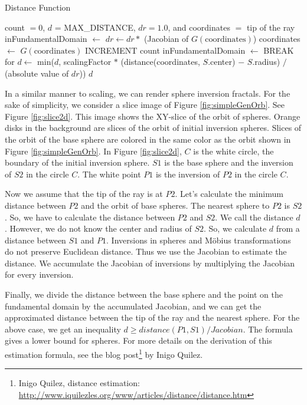 \begin{algorithm}
 \caption{Distance Function}
 \label{iis3d}
 \begin{algorithmic}
  \REQUIRE count $= 0$, $d$ = MAX\_DISTANCE, $dr = 1.0$, and coordinates
  $=$ tip of the ray
  \STATE inFundamentalDomain $\leftarrow$ \TRUE
  \STATE $dr \leftarrow dr * $ (Jacobian of $G(\text{coordinates})$)
  \STATE coordinates $\leftarrow$ $G(\text{coordinates})$
  \STATE INCREMENT count
  \STATE inFundamentalDomain $\leftarrow$ \FALSE
  \ENDIF
  \ENDFOR
  \STATE BREAK for
  \ENDIF
  \ENDFOR
  \STATE $d \leftarrow$ min($d$, scalingFactor $*$ (distance(coordinates, $S$.center) $-$
  $S$.radius) $/$ (absolute value of $dr$))
  \ENDFOR
  \RETURN $d$
 \end{algorithmic}
\end{algorithm}

In a similar manner to scaling, we can render sphere inversion
fractals.
For the sake of simplicity, we consider a slice image of Figure
\ref{fig:simpleGenOrb}.
See Figure \ref{fig:slice2d}. This image shows the XY-slice of the orbit
of spheres.
Orange disks in the background are slices of the orbit of initial inversion spheres.
Slices of the orbit of the base sphere are colored in
the same color as the orbit shown in Figure \ref{fig:simpleGenOrb}.
In Figure \ref{fig:slice2d},
$C$ is the white circle, the boundary of the initial inversion sphere.
$S1$ is the base sphere and the inversion of $S2$ in the circle $C$. 
The white point $P1$ is the inversion of $P2$ in the circle $C$.

Now we assume that the tip of the ray is at $P2$.
Let's calculate the minimum distance between
$P2$ and the orbit of base spheres.
The nearest sphere to $P2$ is $S2$.
So, we have to calculate the distance between $P2$ and $S2$.
We call the distance $d$.
However, we do not know the center and radius of $S2$.
So, we calculate $d$ from a distance between $S1$ and $P1$.
Inversions in spheres and M\"obius transformations do not preserve
Euclidean distance.
Thus we use the Jacobian to estimate the distance.
We accumulate the Jacobian of inversions by multiplying the Jacobian for
every inversion.

Finally, we divide the distance between the base sphere and the point on
the fundamental domain by the accumulated Jacobian, and we can get the
approximated distance between the tip of the ray and the nearest sphere.
For the above case, we get an inequality $d \geq distance(P1, S1)/Jacobian$.
The formula gives a lower bound for spheres.
For more details on the derivation of this estimation formula, see the
blog post\footnote{Inigo Quilez, distance estimation:
\url{http://www.iquilezles.org/www/articles/distance/distance.htm}}
by Inigo Quilez.

